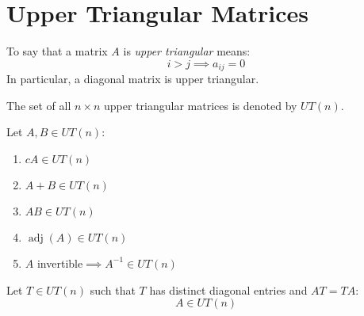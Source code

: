 \documentclass[letterpaper,12pt,fleqn]{article}
\DeclareMathOperator{\adj}{adj}
\begin{document}
\section*{Upper Triangular Matrices}

\begin{definition}
  To say that a matrix $A$ is \emph{upper triangular} means:
  \[i>j\implies a_{ij}=0\]
  In particular, a diagonal matrix is upper triangular.

  The set of all $n\times n$ upper triangular matrices is denoted by $UT(n)$.
\end{definition}

\begin{properties}
  Let $A,B\in UT(n)$:
  \begin{enumerate}
  \item $cA\in UT(n)$
  \item $A+B\in UT(n)$
  \item $AB\in UT(n)$
  \item $\adj(A)\in UT(n)$
  \item $A$ invertible$\implies A^{-1}\in UT(n)$
  \end{enumerate}
\end{properties}

\begin{theorem}
  Let $T\in UT(n)$ such that $T$ has distinct diagonal entries and $AT=TA$:
  \[A\in UT(n)\]
\end{theorem}
\end{document}
